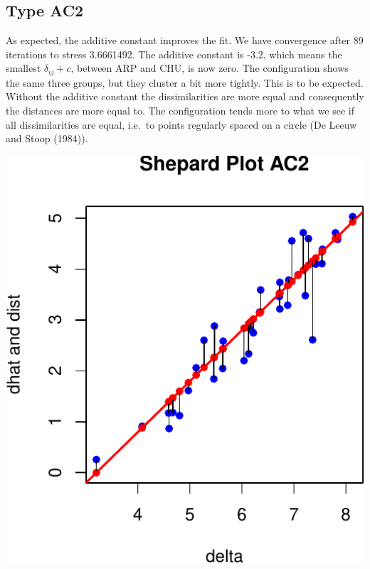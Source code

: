 \documentclass[
  12pt,
]{article}
\begin{document}
\subsection{Type AC2}\label{type-ac2-1}

As expected, the additive constant improves the fit. We have convergence after 89
iterations to stress 3.6661492. The additive constant is -3.2, which means the smallest \(\delta_{ij}+c\), between ARP and CHU, is now zero. The configuration shows the same three groups, but they cluster a bit more tightly. This is to be expected. Without the
additive constant the dissimilarities are more equal and consequently the distances are
more equal to. The configuration tends more to what we see if all dissimilarities are equal,
i.e.~to points regularly spaced on a circle (De Leeuw and Stoop (1984)).

\begin{center}\includegraphics{smacofAC_files/figure-latex/gruijterh10-1} \end{center}
\end{document}
